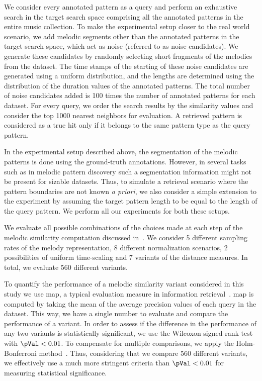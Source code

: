 We consider every annotated pattern as a query and perform an exhaustive search in the target search space comprising all the annotated patterns in the entire music collection. To make the experimental setup closer to the real world scenario, we add melodic segments other than the annotated patterns in the target search space, which act as noise (referred to as noise candidates). We generate these candidates by randomly selecting short fragments of the melodies from the dataset. The time stamps of the starting of these noise candidates are generated using a uniform distribution, and the lengths are determined using the distribution of the duration values of the annotated patterns. The total number of noise candidates added is 100 times the number of annotated patterns for each dataset. For every query, we order the search results by the similarity values and consider the top 1000 nearest neighbors for evaluation. A retrieved pattern is considered as a true hit only if it belongs to the same pattern type as the query pattern. 

In the experimental setup described above, the segmentation of the melodic patterns is done using the ground-truth annotations. However, in several tasks such as in melodic pattern discovery such a segmentation information might not be present for sizable datasets. Thus, to simulate a retrieval scenario where the pattern boundaries are not known \textit{a priori}, we also consider a simple extension to the experiment by assuming the target pattern length to be equal to the length of the query pattern. We perform all our experiments for both these setups. 

We evaluate all possible combinations of the choices made at each step of the melodic similarity computation discussed in~. We consider 5 different sampling rates of the melody representation, 8 different normalization scenarios, 2 possibilities of uniform time-scaling and 7 variants of the distance measures. In total, we evaluate 560 different variants.

To quantify the performance of a melodic similarity variant considered in this study we use \acrfull{map}, a typical evaluation measure in information retrieval~\citep{manning2008introduction}. \Gls{map} is computed by taking the mean of the average precision values of each query in the dataset. This way, we have a single number to evaluate and compare the performance of a variant. In order to assess if the difference in the performance of any two variants is statistically significant, we use the Wilcoxon signed rank-test~\citep{wilcoxon1945individual} with $\pVal < 0.01$. To compensate for multiple comparisons, we apply the Holm-Bonferroni method~\citep{holm1979simple}. Thus, considering that we compare 560 different variants, we effectively use a much more stringent criteria than $\pVal < 0.01$ for measuring statistical significance.


